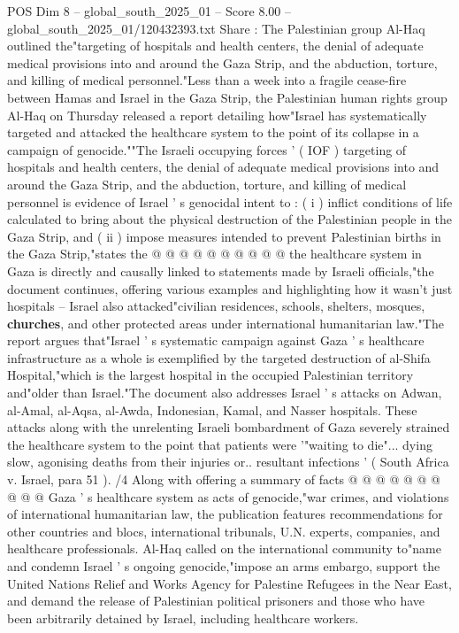 \begin{textsample}{POS Dim 8 – global\_south\_2025\_01 – Score 8.00 – global\_south\_2025\_01/120432393.txt}  \label{ex:f8_pos_119}
Share : The Palestinian group Al-Haq outlined the"targeting of hospitals and health centers, the denial of adequate medical provisions into and around the Gaza Strip, and the abduction, torture, and killing of medical personnel."Less than a week into a fragile cease-fire between Hamas and Israel in the Gaza Strip, the Palestinian human rights group Al-Haq on Thursday released a report detailing how"Israel has systematically targeted and attacked the healthcare system to the point of its collapse in a campaign of genocide.""The Israeli occupying forces ' ( IOF ) targeting of hospitals and health centers, the denial of adequate medical provisions into and around the Gaza Strip, and the abduction, torture, and killing of medical personnel is evidence of Israel ' s genocidal intent to : ( i ) inflict conditions of life calculated to bring about the physical destruction of the Palestinian people in the Gaza Strip, and ( ii ) impose measures intended to prevent Palestinian births in the Gaza Strip,"states the @ @ @ @ @ @ @ @ @ @ the healthcare system in Gaza is directly and causally linked to statements made by Israeli officials,"the document continues, offering various examples and highlighting how it wasn't just hospitals -- Israel also attacked"civilian residences, schools, shelters, mosques, \textbf{churches}, and other protected areas under international humanitarian law."The report argues that"Israel ' s systematic campaign against Gaza ' s healthcare infrastructure as a whole is exemplified by the targeted destruction of al-Shifa Hospital,"which is the largest hospital in the occupied Palestinian territory and"older than Israel."The document also addresses Israel ' s attacks on Adwan, al-Amal, al-Aqsa, al-Awda, Indonesian, Kamal, and Nasser hospitals.
These attacks along with the unrelenting Israeli bombardment of Gaza severely strained the healthcare system to the point that patients were '"waiting to die"... dying slow, agonising deaths from their injuries or.. resultant infections ' ( South Africa v.
Israel, para 51 ). /4 Along with offering a summary of facts @ @ @ @ @ @ @ @ @ @ Gaza ' s healthcare system as acts of genocide,"war crimes, and violations of international humanitarian law, the publication features recommendations for other countries and blocs, international tribunals, U.N. experts, companies, and healthcare professionals.
Al-Haq called on the international community to"name and condemn Israel ' s ongoing genocide,"impose an arms embargo, support the United Nations Relief and Works Agency for Palestine Refugees in the Near East, and demand the release of Palestinian political prisoners and those who have been arbitrarily detained by Israel, including healthcare workers.

\end{textsample}
